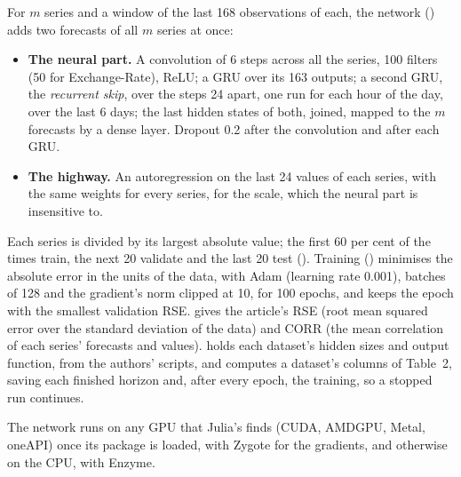 For $m$ series and a window of the last 168 observations of each, the network () adds two forecasts of all
$m$ series at once:
\begin{itemize}
  \item \textbf{The neural part.} A convolution of 6 steps across all the series, 100 filters (50 for Exchange-Rate),
    ReLU; a GRU over its 163 outputs; a second GRU, the \emph{recurrent skip}, over the steps 24 apart, one run for each
    hour of the day, over the last 6 days; the last hidden states of both, joined, mapped to the $m$ forecasts by a
    dense layer. Dropout 0.2 after the convolution and after each GRU.
  \item \textbf{The highway.} An autoregression on the last 24 values of each series, with the same weights for every
    series, for the scale, which the neural part is insensitive to.
\end{itemize}
Each series is divided by its largest absolute value; the first 60 per cent of the times train, the next 20 validate
and the last 20 test (). Training () minimises the absolute error in the units of the data, with
Adam (learning rate 0.001), batches of 128 and the gradient's norm clipped at 10, for 100 epochs, and keeps the epoch
with the smallest validation RSE.  gives the article's RSE (root mean squared error over the standard
deviation of the data) and CORR (the mean correlation of each series' forecasts and values).  holds each
dataset's hidden sizes and output function, from the authors' scripts, and  computes a dataset's columns of
Table~2, saving each finished horizon and, after every epoch, the training, so a stopped run continues.

The network runs on any GPU that Julia's  finds (CUDA, AMDGPU, Metal, oneAPI) once its package is
loaded, with Zygote for the gradients, and otherwise on the CPU, with Enzyme.

